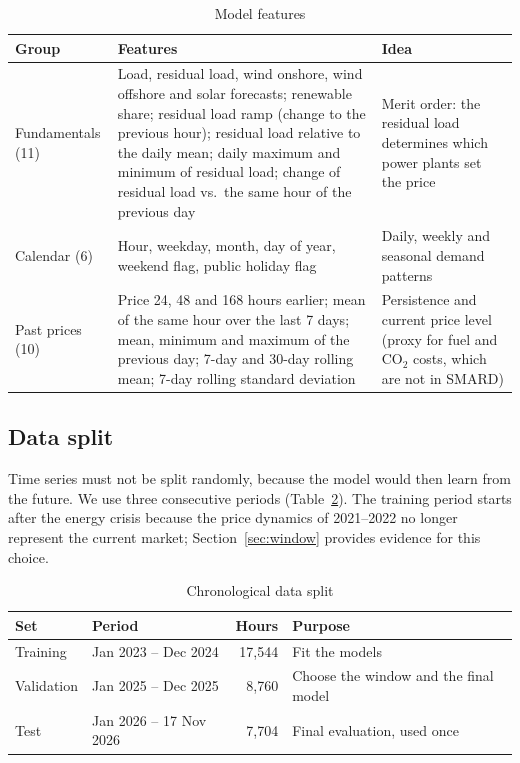 \documentclass[12pt,oneside]{article}
\begin{document}
\begin{table}[!htbp]
    \centering
    \caption{Model features}
    \begin{tabularx}{\textwidth}{lXX}
        \toprule
        Group & Features & Idea \\
        \midrule
        Fundamentals (11) & Load, residual load, wind onshore, wind offshore and solar forecasts; renewable share; residual load ramp (change to the previous hour); residual load relative to the daily mean; daily maximum and minimum of residual load; change of residual load vs.\ the same hour of the previous day & Merit order: the residual load determines which power plants set the price \\
        \midrule
        Calendar (6) & Hour, weekday, month, day of year, weekend flag, public holiday flag & Daily, weekly and seasonal demand patterns \\
        \midrule
        Past prices (10) & Price 24, 48 and 168 hours earlier; mean of the same hour over the last 7 days; mean, minimum and maximum of the previous day; 7-day and 30-day rolling mean; 7-day rolling standard deviation & Persistence and current price level (proxy for fuel and CO$_2$ costs, which are not in SMARD) \\
        \bottomrule
    \end{tabularx}
    \label{tab:features}
\end{table}

\subsection{Data split}

Time series must not be split randomly, because the model would then learn from the future. We use three consecutive periods (Table~\ref{tab:split}). The training period starts after the energy crisis because the price dynamics of 2021--2022 no longer represent the current market; Section~\ref{sec:window} provides evidence for this choice.

\begin{table}[h!]
    \centering
    \caption{Chronological data split}
    \begin{tabular}{llrl}
        \toprule
        Set & Period & Hours & Purpose \\
        \midrule
        Training & Jan 2023 -- Dec 2024 & 17,544 & Fit the models \\
        Validation & Jan 2025 -- Dec 2025 & 8,760 & Choose the window and the final model \\
        Test & Jan 2026 -- 17 Nov 2026 & 7,704 & Final evaluation, used once \\
        \bottomrule
    \end{tabular}
    \label{tab:split}
\end{table}
\end{document}
